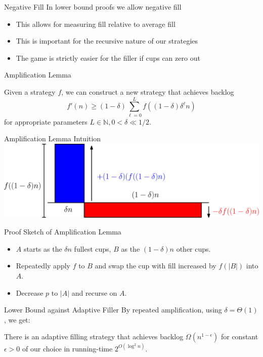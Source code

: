 \documentclass[xcolor=x11names, svgnames, rgb]{beamer}
\begin{document}
\begin{frame}[t]{Negative Fill}
  In lower bound proofs we allow negative fill
  \begin{itemize}
    \item This allows for measuring fill relative to average fill
    \item This is important for the recursive nature of our strategies 
    \item The game is strictly easier for the filler if cups can zero out
  \end{itemize}
\end{frame}

\begin{frame}[t]{Amplification Lemma}
  \begin{lemma}
    Given a strategy $f$, we can construct a new strategy that achieves backlog 
    $$f'(n) \ge (1-\delta)\sum_{\ell=0}^L f((1-\delta)\delta^\ell n)$$
    for appropriate parameters $L\in\mathbb{N}, 0<\delta\ll 1/2$.
  \end{lemma}
\end{frame}

\begin{frame}[t]{Amplification Lemma Intuition}
  \vspace{1.5cm}
  \includegraphics[width=\linewidth]{amplificationImgs/delta_one_minus_delta.eps}
\end{frame}

\begin{frame}[t]{Proof Sketch of Amplification Lemma}
  \begin{itemize}
    \item $A$ starts as the $\delta n$ fullest cups, $B$ as the $(1-\delta)n$ other cups.
    \item Repeatedly apply $f$ to $B$ and swap the cup with fill increased by $f(|B|)$ into $A$. 
    \item Decrease $p$ to $|A|$ and recurse on $A$.
  \end{itemize} 
\end{frame}

\begin{frame}[t]{Lower Bound against Adaptive Filler}
  By repeated amplification, using $\delta=\Theta(1)$, we get: 
  \begin{theorem}
    There is an adaptive filling strategy that achieves
    backlog $\Omega(n^{1-\epsilon})$ for constant
    $\epsilon > 0$ of our choice in running-time $2^{O(\log^2 n)}$.
  \end{theorem}
\end{frame}
\end{document}
